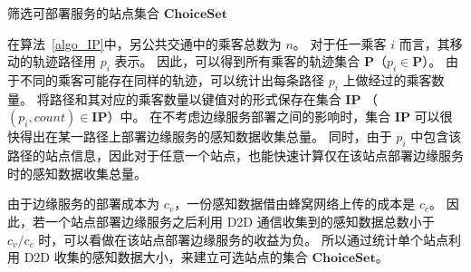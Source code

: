 \begin{algorithm}[!b]
\setstretch{\algostretch}
\caption{筛选可部署服务的站点集合 $\boldsymbol{ChoiceSet}$}
\label{algo_IP}
\end{algorithm}

在算法~\ref{algo_IP}中，另公共交通中的乘客总数为 $n$。
对于任一乘客 $i$ 而言，其移动的轨迹路径用 $p_i$ 表示。
因此，可以得到所有乘客的轨迹集合 $\boldsymbol{P}$（$p_i \in \boldsymbol{P}$）。
由于不同的乘客可能存在同样的轨迹，可以统计出每条路径 $p_i$ 上做经过的乘客数量。
将路径和其对应的乘客数量以键值对的形式保存在集合 $\boldsymbol{IP}$ （$(p_i, count) \in \boldsymbol{IP}$）中。
在不考虑边缘服务部署之间的影响时，集合 $\boldsymbol{IP}$ 可以很快得出在某一路径上部署边缘服务的感知数据收集总量。
同时，由于 $p_i$ 中包含该路径的站点信息，因此对于任意一个站点，也能快速计算仅在该站点部署边缘服务时的感知数据收集总量。

由于边缘服务的部署成本为 $c_v$，一份感知数据借由蜂窝网络上传的成本是  $c_c$。
因此，若一个站点部署边缘服务之后利用 D2D 通信收集到的感知数据总数小于 $c_v/c_c$ 时，可以看做在该站点部署边缘服务的收益为负。
所以通过统计单个站点利用 D2D 收集的感知数据大小，来建立可选站点的集合 $\boldsymbol{ChoiceSet}$。





